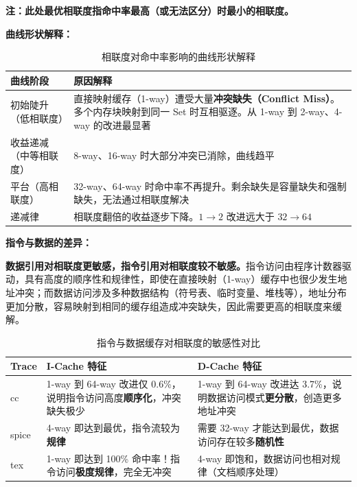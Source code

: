 \documentclass[12pt,a4paper]{article}
\begin{document}
\textbf{注：此处最优相联度指命中率最高（或无法区分）时最小的相联度。}

\textbf{曲线形状解释：}

\begin{table}[H]
\centering
\small
\caption{相联度对命中率影响的曲线形状解释}
\begin{tabular}{p{4cm}p{11cm}}
\toprule
\textbf{曲线阶段} & \textbf{原因解释} \\
\midrule
初始陡升（低相联度） & 直接映射缓存（1-way）遭受大量\textbf{冲突缺失（Conflict Miss）}。多个内存块映射到同一 Set 时互相驱逐。从 1-way 到 2-way、4-way 的改进最显著 \\
\midrule
收益递减（中等相联度） & 8-way、16-way 时大部分冲突已消除，曲线趋平 \\
\midrule
平台（高相联度） & 32-way、64-way 时命中率不再提升。剩余缺失是容量缺失和强制缺失，无法通过相联度解决 \\
\midrule
递减律 & 相联度翻倍的收益逐步下降。$1\to2$ 改进远大于 $32\to64$ \\
\bottomrule
\end{tabular}
\end{table}

\textbf{指令与数据的差异：}

\textbf{数据引用对相联度更敏感，指令引用对相联度较不敏感。}指令访问由程序计数器驱动，具有高度的顺序性和规律性，即使在直接映射（1-way）缓存中也很少发生地址冲突；而数据访问涉及多种数据结构（符号表、临时变量、堆栈等），地址分布更加分散，容易映射到相同的缓存组造成冲突缺失，因此需要更高的相联度来缓解。

\begin{table}[H]
\centering
\small
\caption{指令与数据缓存对相联度的敏感性对比}
\begin{tabular}{p{2.5cm}p{6cm}p{6cm}}
\toprule
\textbf{Trace} & \textbf{I-Cache 特征} & \textbf{D-Cache 特征} \\
\midrule
cc & 1-way 到 64-way 改进仅 0.6\%，说明指令访问高度\textbf{顺序化}，冲突缺失极少 & 1-way 到 64-way 改进达 3.7\%，说明数据访问模式\textbf{更分散}，创造更多地址冲突 \\
\midrule
spice & 4-way 即达到最优，指令流较为\textbf{规律} & 需要 32-way 才能达到最优，数据访问存在较多\textbf{随机性} \\
\midrule
tex & 1-way 即达到 100\% 命中率！指令访问\textbf{极度规律}，完全无冲突 & 4-way 即饱和，数据访问也相对规律（文档顺序处理） \\
\bottomrule
\end{tabular}
\end{table}
\end{document}
